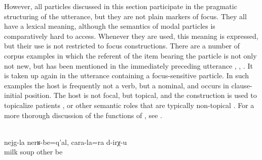 However, all particles discussed in this section participate in the pragmatic structuring of the utterance, but they are not plain markers of focus. They all have a lexical meaning, although the semantics of modal particles is comparatively hard to access. Whenever they are used, this meaning is expressed, but their use is not restricted to focus constructions. There are a number of corpus examples in which the referent of the item bearing the particle is not only not new, but has been mentioned in the immediately preceding utterance , , . It is taken up again in the utterance containing a focus-sensitive particle. In such examples the host is frequently not a verb, but a nominal, and occurs in clause-initial position. The host is not focal, but topical, and the construction is used to topicalize patients ,  or other semantic roles that are typically non-topical . For a more thorough discussion of the functions of , see \citet{ForkerSubmittedc}.
%
\begin{exe}
	\\\label{ex:There is milk soup and soup from other things@21}%
	\gll	nejg-la	nerʁ-be=q'al,	cara-la=ra	d-irχ-u\\
		milk	soup	other	be\\
	\glt	{}
\end{exe}
